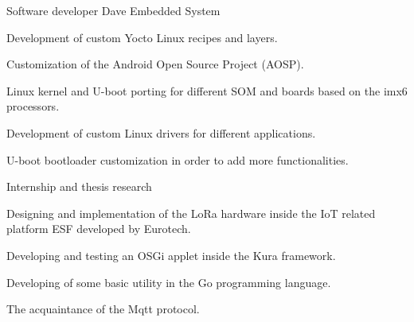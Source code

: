 \documentclass[english,a4paper]{europasscv}
\begin{document}
\begin{europasscv}


		 {
			Software developer Dave Embedded System
		}
		\ecvitem{} {
			\begin{ecvitemize}
				\item Development of custom Yocto Linux recipes and layers.
				\item Customization of the Android Open Source Project (AOSP).
				\item Linux kernel and U-boot porting for different SOM and
					boards based on the imx6 processors.
				\item Development of custom Linux drivers for different
					applications.
				\item U-boot bootloader customization in order to add
					more functionalities.
			\end{ecvitemize}
		}

		 {
			Internship and thesis research
		}
		\ecvitem{} {
			\begin{ecvitemize}
					\item Designing and implementation of the LoRa hardware
						inside the IoT related platform ESF developed by Eurotech.
					\item Developing and testing an OSGi applet inside the Kura
						framework.
					\item Developing of some basic utility in the Go programming
						language.
					\item The acquaintance of the Mqtt protocol.
			\end{ecvitemize}
		}


\end{europasscv}
\end{document}
